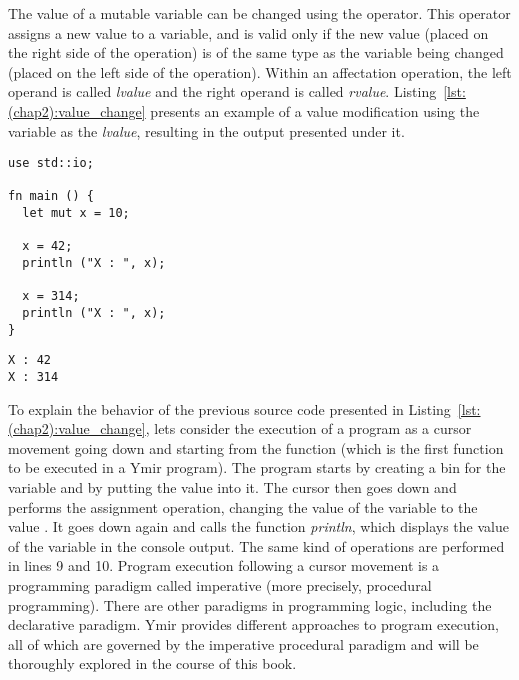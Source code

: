 The value of a mutable variable can be changed using the \token{=} operator.
This operator assigns a new value to a variable, and is valid only if the new
value (placed on the right side of the operation) is of the same type as the
variable being changed (placed on the left side of the operation). Within an
affectation operation, the left operand is called \textit{lvalue} and the right
operand is called \textit{rvalue}. Listing~\ref{lst:(chap2):value_change}
presents an example of a value modification using the variable  as the
\textit{lvalue}, resulting in the output presented under it.

\begin{lstlisting}[style=coloredVerbatim, caption=Example of mutable variable, label=lst:(chap2):value_change]
use std::io;

fn main () {
  let mut x = 10;

  x = 42;
  println ("X : ", x);

  x = 314;
  println ("X : ", x);
}
\end{lstlisting}
\vspace{-10pt}%
\begin{lstlisting}[style=bashVerb, label=lst:(chap2):value_change_output]
X : 42
X : 314
\end{lstlisting}

To explain the behavior of the previous source code presented in
Listing~\ref{lst:(chap2):value_change}, lets consider the execution of a program
as a cursor movement going down and starting from the  function
(which is the first function to be executed in a Ymir program). The program
starts by creating a bin for the variable  and by putting the value
 into it. The cursor then goes down and performs the assignment
operation, changing the value of the variable  to the value .
It goes down again and calls the function \textit{println}, which displays the
value of the variable  in the console output. The same kind of
operations are performed in lines 9 and 10. Program execution following a cursor
movement is a programming paradigm called imperative (more precisely, procedural
programming). There are other paradigms in programming logic, including the
declarative paradigm. Ymir provides different approaches to program execution,
all of which are governed by the imperative procedural paradigm and will be
thoroughly explored in the course of this book.

